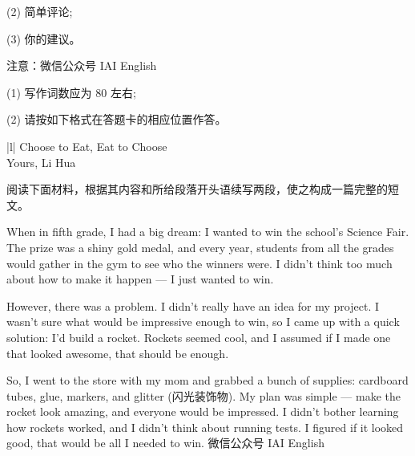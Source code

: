 \documentclass{英语试卷}
\begin{document}
\par (2) 简单评论;\par
\par (3) 你的建议。\par
\par 注意：微信公众号 IAI English\par
\par (1) 写作词数应为 80 左右;\par
\par (2) 请按如下格式在答题卡的相应位置作答。\par
\par [图片]\par
\par\vspace{0.4em}
\begin{center}\begin{tabular}{{|l|}}
\hline
Choose to Eat, Eat to Choose \\
Yours, Li Hua \\
\hline
\end{tabular}\end{center}
\vspace{0.4em}
\par 阅读下面材料，根据其内容和所给段落开头语续写两段，使之构成一篇完整的短文。\par
\par When in fifth grade, I had a big dream: I wanted to win the school's Science Fair. The prize was a shiny gold medal, and every year, students from all the grades would gather in the gym to see who the winners were. I didn't think too much about how to make it happen — I just wanted to win.\par
\par However, there was a problem. I didn't really have an idea for my project. I wasn't sure what would be impressive enough to win, so I came up with a quick solution: I'd build a rocket. Rockets seemed cool, and I assumed if I made one that looked awesome, that should be enough.\par
\par So, I went to the store with my mom and grabbed a bunch of supplies: cardboard tubes, glue, markers, and glitter (闪光装饰物). My plan was simple — make the rocket look amazing, and everyone would be impressed. I didn't bother learning how rockets worked, and I didn't think about running tests. I figured if it looked good, that would be all I needed to win. 微信公众号 IAI English\par
\end{document}
